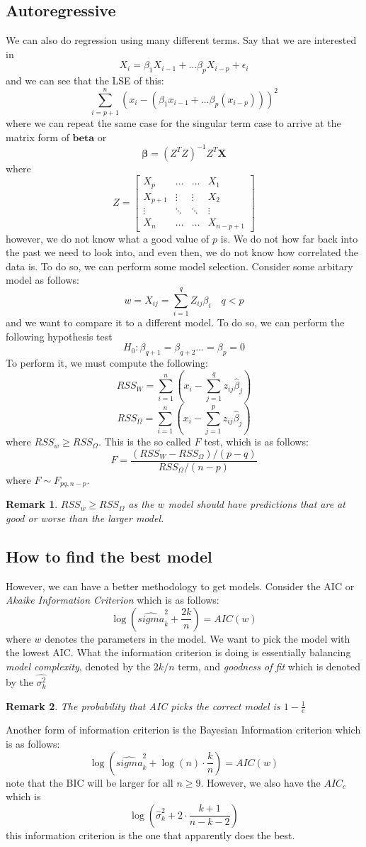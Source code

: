 \documentclass[12pt]{article}
\newtheorem{remark}{Remark}
\begin{document}
\subsection{Autoregressive}
We can also do regression using many different terms. Say that we are interested in 
\[
	X_i = \beta_1 X_{i-1} + \dots \beta_p X_{i - p} + \epsilon_i 
\]
and we can see that the LSE of this:
\[
	\sum_{i = p+1}^n (x_i - (\beta_1x_{i-1} + \dots \beta_p(x_{i-p})))^2 
\]
where we can repeat the same case for the singular term case to arrive at the matrix form of $\mathbf{beta}$ or 
\[
	\mathbf{\beta} = (Z^TZ)^{-1} Z^T \mathbf{X}
\]
where 
\[
	Z = \begin{bmatrix}
		X_p & \dots & \dots & X_1 \\ 
		X_{p+1} &\vdots & \vdots & X_2\\ 
		\vdots & \ddots & \ddots & \vdots \\
		X_n & \dots & \dots & X_{n-p+1} 
	\end{bmatrix}
\]
however, we do not know what a good value of $p$ is. We do not how far back into the past we need to look into, and even then, we do not know how correlated the data is. To do so, we can perform some model selection. Consider some arbitary model as follows:
\[
	w = X_{ij} = \sum_{i=1}^q Z_{ij}\beta_i \quad q < p
\]
and we want to compare it to a different model. To do so, we can perform the following hypothesis test 
\[
	H_0 : \beta_{q+1} = \beta_{q+2} \dots = \beta_p = 0 
\]
To perform it, we must compute the following:
\[
	RSS_W = \sum_{i = 1}^n \left( x_i - \sum_{j=1}^q z_{ij} \hat{\beta}_j\right)
\]
\[
	RSS_\Omega = \sum_{i = 1}^n \left( x_i - \sum_{j=1}^p z_{ij} \hat{\beta}_j\right)
\]
where $RSS_w \geq RSS_\Omega$. This is the so called $F$ test, which is as follows:
\[
F = 	\frac{(RSS_W - RSS_\Omega)/(p-q)}{RSS_\Omega / (n-p)}
\]
where $F \sim F_{pq, n-p}$.
\begin{remark}
$RSS_w \geq RSS_\Omega$ as the $w$ model should have predictions that are at good or worse than the larger model. 
\end{remark}
\subsection{How to find the best model}
However, we can have a better methodology to get models. Consider the AIC or \emph{Akaike Information Criterion} which is as follows:
\[
	\log \left( \hat{sigma}_k^2 + \frac{2k}{n} \right) = AIC(w)
\]
where $w$ denotes the parameters in the model. We want to pick the model with the lowest AIC. What the information criterion is doing is essentially balancing \emph{model complexity}, denoted by the $2k/n$ term, and \emph{goodness of fit} which is denoted by the $\hat{\sigma_k^2}$ 
\begin{remark}
	The probability that AIC picks the correct model is $1 - \frac{1}{e}$
\end{remark}
Another form of information criterion is the Bayesian Information criterion which is as follows:
\[
	\log \left( \hat{sigma}_k^2 + \log(n) \cdot \frac{k}{n} \right) = AIC(w)
\]
note that the BIC will be larger for all $n \geq 9$. However, we also have the $AIC_c$ which is 
\[
	\log \left( \hat{\sigma}_k^2 + 2 \cdot \frac{k+1}{n-k-2}\right)
\]
this information criterion is the one that apparently does the best. 
\end{document}
